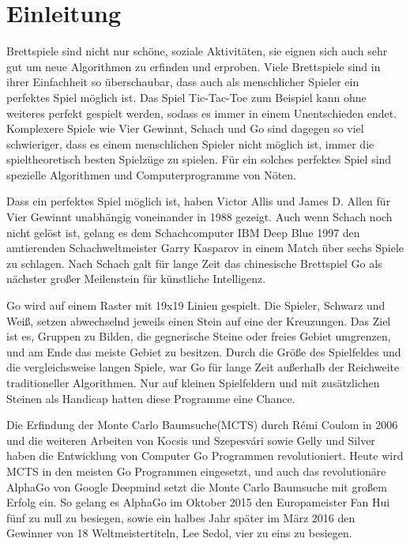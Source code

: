 \section{Einleitung}
\par 
Brettspiele sind nicht nur schöne, soziale Aktivitäten, sie eignen sich auch sehr gut um neue Algorithmen zu erfinden und erproben. Viele Brettspiele sind in ihrer Einfachheit so überschaubar, dass auch als menschlicher Spieler ein perfektes Spiel möglich ist. Das Spiel Tic-Tac-Toe zum Beispiel kann ohne weiteres perfekt gespielt werden, sodass es immer in einem Unentschieden endet. Komplexere Spiele wie Vier Gewinnt, Schach und Go sind dagegen so viel schwieriger, dass es einem menschlichen Spieler nicht möglich ist, immer die spieltheoretisch besten Spielzüge zu spielen. Für ein solches perfektes Spiel sind spezielle Algorithmen und Computerprogramme von Nöten.
\par 
Dass ein perfektes Spiel möglich ist, haben Victor Allis\autocite{allisKnowledgeBasedApproachConnectFour1988} und James D. Allen\autocite{allenExpertPlayConnectFour} für Vier Gewinnt unabhängig voneinander in 1988 gezeigt. Auch wenn Schach noch nicht gelöst ist, gelang es dem Schachcomputer IBM Deep Blue 1997 den amtierenden Schachweltmeister Garry Kasparov in einem Match über sechs Spiele zu schlagen\autocite{IBM100DeepBlue2012}. Nach Schach galt für lange Zeit das chinesische Brettspiel Go als nächster großer Meilenstein für künstliche Intelligenz.
\par 
Go wird auf einem Raster mit 19x19 Linien gespielt. Die Spieler, Schwarz und Weiß, setzen abwechselnd jeweils einen Stein auf eine der Kreuzungen. Das Ziel ist es, Gruppen zu Bilden, die gegnerische Steine oder freies Gebiet umgrenzen, und am Ende das meiste Gebiet zu besitzen. Durch die Größe des Spielfeldes und die vergleichsweise langen Spiele, war Go für lange Zeit außerhalb der Reichweite traditioneller Algorithmen. Nur auf kleinen Spielfeldern und mit zusätzlichen Steinen als Handicap hatten diese Programme eine Chance.\autocite{burnmeisterCSTR339ComputerGo}
\par 
Die Erfindung der Monte Carlo Baumsuche(MCTS) durch Rémi Coulom in 2006\autocite{coulomEfficientSelectivityBackup2007} und die weiteren Arbeiten von Kocsis und Szepesvári\autocite{kocsisBanditBasedMonteCarlo2006} sowie Gelly und Silver \autocite{gellyCombiningOnlineOffline2007} haben die Entwicklung von Computer Go Programmen revolutioniert. Heute wird MCTS in den meisten Go Programmen eingesetzt, und auch das revolutionäre AlphaGo von Google Deepmind\autocite{silverMasteringGameGo2016} setzt die Monte Carlo Baumsuche mit großem Erfolg ein. So gelang es AlphaGo im Oktober 2015 den Europameister Fan Hui fünf zu null zu besiegen, sowie ein halbes Jahr später im März 2016 den Gewinner von 18 Weltmeistertiteln, Lee Sedol, vier zu eins zu besiegen. \autocite{AlphaGoStoryFar}